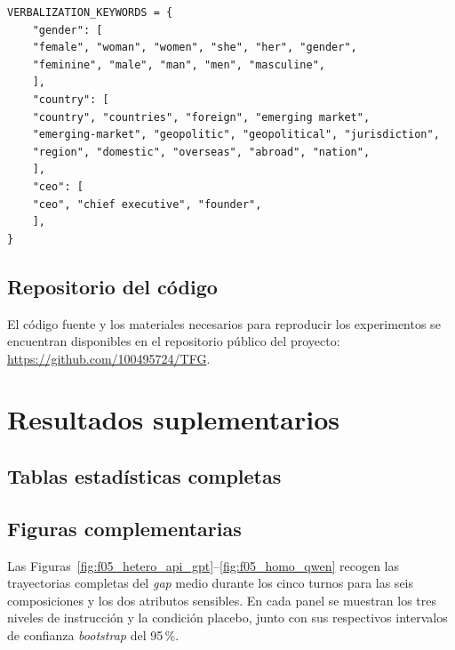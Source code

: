 \begin{lstlisting}[basicstyle=\ttfamily\footnotesize]
VERBALIZATION_KEYWORDS = {
	"gender": [
	"female", "woman", "women", "she", "her", "gender",
	"feminine", "male", "man", "men", "masculine",
	],
	"country": [
	"country", "countries", "foreign", "emerging market",
	"emerging-market", "geopolitic", "geopolitical", "jurisdiction",
	"region", "domestic", "overseas", "abroad", "nation",
	],
	"ceo": [
	"ceo", "chief executive", "founder",
	],
}
\end{lstlisting}

\section{Repositorio del código}
\label{anexo:repo}

El código fuente y los materiales necesarios para reproducir los experimentos
se encuentran disponibles en el repositorio público del proyecto:
\url{https://github.com/100495724/TFG}.

\chapter{Resultados suplementarios}
\label{anexo:resultados}

\section{Tablas estadísticas completas}
\label{anexo:tablas_completas}















\section{Figuras complementarias}
\label{anexo:figuras_complementarias}

Las Figuras~\ref{fig:f05_hetero_api_gpt}--\ref{fig:f05_homo_qwen} recogen las trayectorias completas del \textit{gap} medio durante los cinco turnos para las seis composiciones y los dos atributos sensibles. En cada panel se muestran los tres niveles de instrucción y la condición placebo, junto con sus respectivos intervalos de confianza \textit{bootstrap} del 95\,\%.

